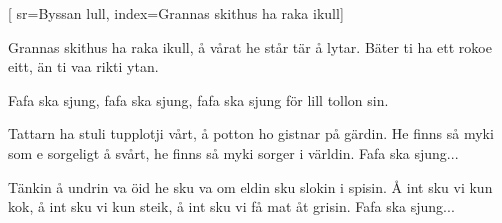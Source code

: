 

[ 		%
	sr={Byssan lull},					%
	index={Grannas skithus ha raka ikull}]						%
	


\beginverse*						%
Grannas skithus ha raka ikull,
å vårat he står tär å lytar.
Bäter ti ha ett rokoe eitt,
än ti vaa rikti ytan.
\endverse							%

\beginchorus
Fafa ska sjung,
fafa ska sjung,
fafa ska sjung för lill tollon sin.
\endchorus

\beginverse*						%
Tattarn ha stuli tupplotji vårt,
å potton ho gistnar på gärdin. 
He finns så myki som
e sorgeligt å svårt,
he finns så myki sorger i världin.
\endverse		
\beginchorus
Fafa ska sjung...
\endchorus					%

\beginverse*						%
Tänkin å undrin va öid he sku va
om eldin sku slokin i spisin.
Å int sku vi kun kok,
å int sku vi kun steik,
å int sku vi få mat åt grisin.
\endverse		
\beginchorus
Fafa ska sjung...
\endchorus					%






\endsong							%